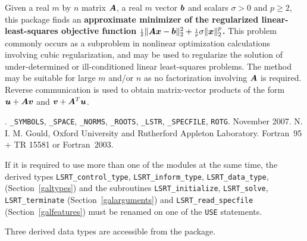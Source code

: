 \documentclass{galahad}
\newcommand{\packagename}{LS\-RT}
\newcommand{\fullpackagename}{\libraryname\_\packagename}
\begin{document}
\galheader


\galsummary
Given a real $m$ by $n$ matrix ${\bm{A}}$, a real $m$ vector ${\bm{b}}$ and
scalars $\sigma>0$ and $p \geq 2$, this package finds an
{\bf approximate minimizer of the regularized linear-least-squares
objective function
${\scriptstyle \frac{1}{2}}\| {\bm{A}} {\bm{x}} - {\bm{b}}\|_2^2 + {\scriptstyle \frac{1}{p}} \sigma \| {\bm{x}} \|_2^p$.}
This problem commonly occurs as a subproblem in nonlinear
optimization calculations involving cubic regularization,
and may be used to regularize the solution
of under-determined or ill-conditioned linear least-squares problems.
The method may be suitable for large $m$ and/or $n$ as no factorization
involving ${\bm{A}}$ is required. Reverse communication is used to obtain
matrix-vector products of the form ${\bm{u}} + {\bm{A}} {\bm{v}}$ and
${\bm{v}} + {\bm{A}}^T {\bm{u}}$.


\galattributes
\galversions{\tt  \fullpackagename\_single, \fullpackagename\_double}.
\galuses
{\tt \libraryname\_SY\-M\-BOLS},
{\tt \libraryname\_SPACE}, {\tt \libraryname\_\-NORMS},
{\tt \libraryname\_ROOTS}, {\tt \libraryname\_LSTR},
{\tt \libraryname\_SPECFILE},
{\tt *ROTG}.
\galdate November 2007.
\galorigin N. I. M. Gould, Oxford University and Rutherford Appleton Laboratory.
\gallanguage Fortran~95 + TR 15581 or Fortran~2003.


\galhowto



\noindent
If it is required to use more than one of the modules at the same time, 
the derived types
{\tt \packagename\_control\_type}, {\tt \packagename\_inform\_type},
{\tt \packagename\_data\_type},
(Section~\ref{galtypes})
and the subroutines
{\tt \packagename\_initialize},
{\tt \packagename\_solve}, {\tt \packagename\_terminate}
(Section~\ref{galarguments})
and
{\tt \packagename\_read\_specfile}
(Section~\ref{galfeatures})
must be renamed on one of the {\tt USE} statements.





\galtypes
Three derived data types are accessible from the package.
\end{document}
